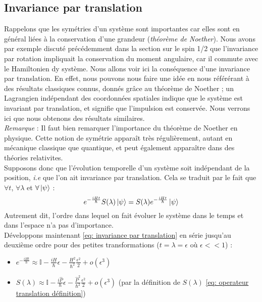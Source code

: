 \documentclass{article}
\begin{document}
\subsection*{Invariance par translation}

Rappelons que les symétries d'un système sont importantes car elles sont en général liées à la conservation d'une grandeur (\textit{théorème de Noether}). Nous avons par exemple discuté précédemment dans la section sur le spin 1/2 que l'invariance par rotation impliquait la conservation du moment angulaire, car il commute avec le Hamiltonien dy système. 
Nous allons voir ici la conséquence d'une invariance par translation. En effet, nous pouvons nous faire une idée en nous référérant à des résultats classiques connus, donnés grâce au théorème de Noether ; un Lagrangien indépendant des coordonnées spatiales indique que le système est invariant par translation, et signifie que l'impulsion est conservée. Nous verrons ici que nous obtenons des résultats similaires. \\

\textit{Remarque} : Il faut bien remarquer l'importance du théorème de Noether en physique. Cette notion de symétrie apparaît très régulièrement, autant en mécanique classique que quantique, et peut également apparaître dans des théories relativites. \\

Supposons donc que l'évolution temporelle d'un système soit indépendant de la position, \textit{i.e} que l'on ait invariance par translation. Cela se traduit par le fait que $\forall t$, $\forall \lambda$ et $\forall \ket{\psi}$ : \begin{equation}
    e^{-\frac{iHt}{\hbar}} S(\lambda) \ket{\psi} = S(\lambda) e^{-\frac{iHt}{\hbar}} \ket{\psi} 
\label{eq: invariance par translation}
\end{equation}
Autrement dit, l'ordre dans lequel on fait évoluer le système dans le temps et dans l'espace n'a pas d'importance. \\
Développons maintenant \eqref{eq: invariance par translation} en série jusqu'au deuxième ordre pour des petites transformations ($t = \lambda = \epsilon$ où $\epsilon << 1$) : 
\begin{itemize}[label = \textbullet]
    \item $ e^{-\frac{iHt}{\hbar}} \approx \mathbb{I} - \frac{iH}{\hbar}\epsilon - \frac{H^2}{\hbar^2}\frac{\epsilon^2}{2} + o(\epsilon^3)$ 
    \item $ S(\lambda) \approx \mathbb{I} - \frac{i\hat{P}}{\hbar}\epsilon - \frac{\hat{P}^2}{\hbar^2}\frac{\epsilon^2}{2} + o(\epsilon^3)$ (par la définition de $S(\lambda)$ \eqref{eq: operateur translation définition})
\end{itemize}
\end{document}
